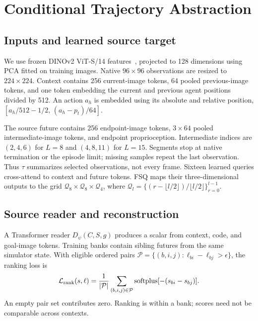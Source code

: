 \section{Conditional Trajectory Abstraction}
\label{sec:method}
\subsection{Inputs and learned source target}
\label{sec:source}
We use frozen DINOv2 ViT-S/14 features~\cite{oquab2024dinov2}, projected to 128 dimensions using PCA fitted on training images. Native $96\times96$ observations are resized to $224\times224$. Context contains 256 current-image tokens, 64 pooled previous-image tokens, and one token embedding the current and previous agent positions divided by 512. An action $a_h$ is embedded using its absolute and relative position, $[a_h/512-1/2,\,(a_h-p_t)/64]$.

The source future contains 256 endpoint-image tokens, $3\times64$ pooled intermediate-image tokens, and endpoint proprioception. Intermediate indices are $(2,4,6)$ for $L=8$ and $(4,8,11)$ for $L=15$. Segments stop at native termination or the episode limit; missing samples repeat the last observation. Thus $\tau$ summarizes selected observations, not every frame. Sixteen learned queries cross-attend to context and future tokens. FSQ maps their three-dimensional outputs to the grid $\mathcal Q_8\times\mathcal Q_8\times\mathcal Q_4$, where $\mathcal Q_l=\{(r-\lfloor l/2\rfloor)/\lfloor l/2\rfloor\}_{r=0}^{l-1}$.

\subsection{Source reader and reconstruction}
\label{sec:reader}
A Transformer reader $D_\psi(C,S,g)$ produces a scalar from context, code, and goal-image tokens. Training banks contain sibling futures from the same simulator state. With eligible ordered pairs $\mathcal P=\{(b,i,j):\ell_{bi}-\ell_{bj}>\epsilon\}$, the ranking loss is
\begin{equation}
\mathcal L_{\rm rank}(s,\ell)=\frac{1}{|\mathcal P|}
\sum_{(b,i,j)\in\mathcal P}\operatorname{softplus}[-(s_{bi}-s_{bj})].
\label{eq:rank}
\end{equation}
An empty pair set contributes zero. Ranking is within a bank; scores need not be comparable across contexts.

